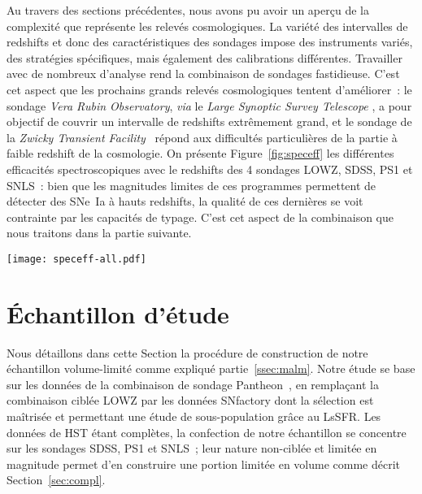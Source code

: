 \documentclass[../main/main.tex]{subfiles}
\begin{document}
Au travers des sections précédentes, nous avons pu avoir un aperçu de la
complexité que représente les relevés cosmologiques. La variété des intervalles
de redshifts et donc des caractéristiques des sondages impose des instruments
variés, des stratégies spécifiques, mais également des calibrations différentes.
Travailler avec de nombreux  d'analyse rend la combinaison de
sondages fastidieuse. C'est cet aspect que les prochains grands relevés
cosmologiques tentent d'améliorer~: le sondage \textit{Vera Rubin Observatory},
\textit{via} le \textit{Large Synoptic Survey Telescope}
\citep[LSST,][]{ivezic2019}, a pour objectif de couvrir un intervalle de
redshifts extrêmement grand, et le sondage de la \textit{Zwicky Transient
Facility}~\citep[ZTF,][]{bellm2019, dekany2020} répond aux difficultés
particulières de la partie à faible redshift de la cosmologie. On présente
Figure~\ref{fig:speceff} les différentes efficacités spectroscopiques avec le
redshifts des 4 sondages LOWZ, SDSS, PS1 et SNLS~: bien que les magnitudes
limites de ces programmes permettent de détecter des SNe~Ia à hauts redshifts,
la qualité de ces dernières se voit contrainte par les capacités de typage.
C'est cet aspect de la combinaison que nous traitons dans la partie suivante.

\begin{SCfigure}[0,5][h!]
    \centering
    \texttt{[image: speceff-all.pdf]}
    \caption{Comparaison des efficacités spectroscopiques des différents
    sondages.}
    \label{fig:speceff}
\end{SCfigure}

\section{Échantillon d'étude}\label{sec:sample}

Nous détaillons dans cette Section la procédure de construction de notre
échantillon volume-limité comme expliqué partie~\ref{ssec:malm}. Notre étude se
base sur les données de la combinaison de sondage Pantheon~\citep{scolnic2018},
en remplaçant la combinaison ciblée LOWZ par les données SNfactory dont la
sélection est maîtrisée et permettant une étude de sous-population grâce au
LsSFR. Les données de HST étant complètes, la confection de notre échantillon se
concentre sur les sondages SDSS, PS1 et SNLS~; leur nature non-ciblée et limitée
en magnitude permet d'en construire une portion limitée en volume comme décrit
Section~\ref{sec:compl}.
\end{document}
